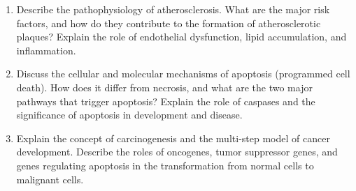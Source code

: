 \documentclass[11pt]{article}
\begin{document}
\begin{enumerate}[label=\textbf{\arabic*.}]
  \item Describe the pathophysiology of atherosclerosis. What are the major risk factors, and how 
  do they contribute to the formation of atherosclerotic plaques? Explain the role of endothelial 
  dysfunction, lipid accumulation, and inflammation.

  \item Discuss the cellular and molecular mechanisms of apoptosis (programmed cell death). How does 
  it differ from necrosis, and what are the two major pathways that trigger apoptosis? Explain the 
  role of caspases and the significance of apoptosis in development and disease.

  \item Explain the concept of carcinogenesis and the multi-step model of cancer development. Describe 
  the roles of oncogenes, tumor suppressor genes, and genes regulating apoptosis in the transformation 
  from normal cells to malignant cells.

\end{enumerate}
\end{document}
